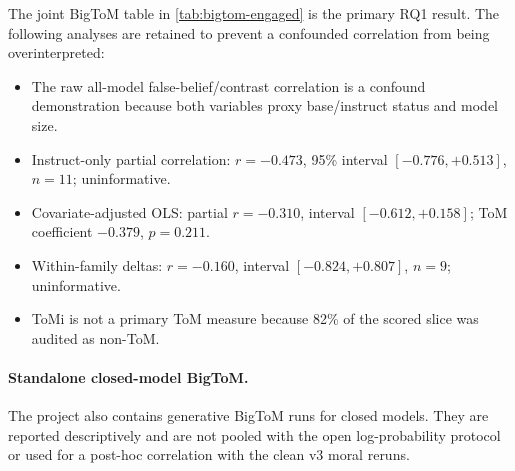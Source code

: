 The joint BigToM table in \cref{tab:bigtom-engaged} is the primary RQ1 result.
The following analyses are retained to prevent a confounded correlation from being overinterpreted:
\begin{itemize}[leftmargin=*]
    \item The raw all-model false-belief/contrast correlation is a confound demonstration because both variables proxy base/instruct status and model size.
    \item Instruct-only partial correlation: $r=-0.473$, 95\% interval $[-0.776,+0.513]$, $n=11$; uninformative.
    \item Covariate-adjusted OLS: partial $r=-0.310$, interval $[-0.612,+0.158]$; ToM coefficient $-0.379$, $p=0.211$.
    \item Within-family deltas: $r=-0.160$, interval $[-0.824,+0.807]$, $n=9$; uninformative.
    \item ToMi is not a primary ToM measure because 82\% of the scored slice was audited as non-ToM.
\end{itemize}

\paragraph{Standalone closed-model BigToM.}
The project also contains generative BigToM runs for closed models.
They are reported descriptively and are not pooled with the open log-probability protocol or used for a post-hoc correlation with the clean v3 moral reruns.

